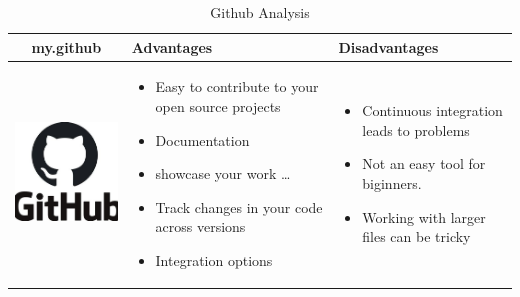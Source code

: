 \documentclass{article}
\begin{document}
	
	\begin{table}[h!]
	\centering
	\begin{tabular}{| c | m{5cm} | m{5cm} }
		\hline
		my.github & Advantages & Disadvantages \\ \hline
		\begin{minipage}{.4\textwidth}
			\includegraphics[width=\linewidth, height=40mm]{github}
		\end{minipage}
	&
	\begin{itemize}
		\item Easy to contribute to your open source projects
		\item Documentation
		\item showcase your work \ldots 
		\item Track changes in your code across versions
		\item Integration options 
	\end{itemize}
    &
    \begin{itemize}
    	\item Continuous integration leads to problems
    	\item Not an easy tool for biginners.
    	\item Working with larger files can be tricky
    \end{itemize}
    \\ \hline
\end{tabular}
\caption{Github Analysis}
\label{tbl:my github}
\end{table}
\end{document}
